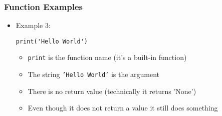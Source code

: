 \documentclass[english,14pt]{beamer}
\begin{document}
\begin{frame}[fragile]
\frametitle{Function Examples}
\begin{itemize}
\item Example 3:
\begin{lstlisting}[style=CStyle]
print('Hello World')
\end{lstlisting}
	\begin{itemize}
		\item \texttt{print} is the function name (it's a built-in function)
		\item The string \texttt{'Hello World'} is the argument
		\item There is no return value (technically it returns 'None')
		\item Even though it does not return a value it still does something
	\end{itemize}
\end{itemize}
\end{frame}


% 
% 
\end{document}
